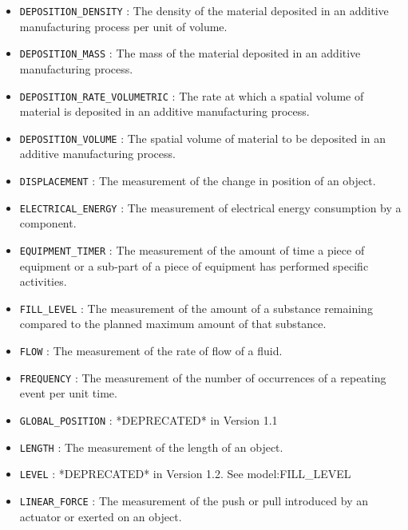 \begin{itemize}
\item \texttt{DEPOSITION_DENSITY} : The density of the material deposited in an additive manufacturing process per unit of volume. 

\item \texttt{DEPOSITION_MASS} : The mass of the material deposited in an additive manufacturing process. 

\item \texttt{DEPOSITION_RATE_VOLUMETRIC} : The rate at which a spatial volume of material is deposited in an additive manufacturing process. 

\item \texttt{DEPOSITION_VOLUME} : The spatial volume of material to be deposited in an additive manufacturing process. 

\item \texttt{DISPLACEMENT} : The measurement of the change in position of an object. 

\item \texttt{ELECTRICAL_ENERGY} : The measurement of electrical energy consumption by a component. 

\item \texttt{EQUIPMENT_TIMER} : The measurement of the amount of time a piece of equipment or a sub-part of a piece of equipment has performed specific activities. 

\item \texttt{FILL_LEVEL} : The measurement of the amount of a substance remaining compared to the planned maximum amount of that substance. 

\item \texttt{FLOW} : The measurement of the rate of flow of a fluid. 

\item \texttt{FREQUENCY} : The measurement of the number of occurrences of a repeating event per unit time. 

\item \texttt{GLOBAL_POSITION} : *DEPRECATED* in Version 1.1 

\item \texttt{LENGTH} : The measurement of the length of an object. 

\item \texttt{LEVEL} : *DEPRECATED* in Version 1.2.  See {model:FILL_LEVEL} 

\item \texttt{LINEAR_FORCE} : The measurement of the push or pull introduced by an actuator or exerted on an object. 


\end{itemize}
